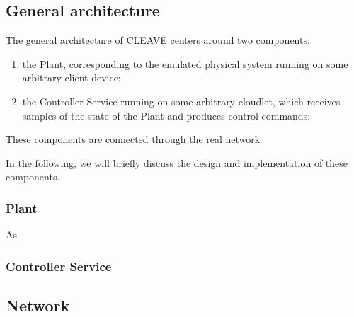 \begin{description}[wide]
\end{description}


\subsection{General architecture}

The general architecture of CLEAVE centers around two components:

\begin{enumerate}
    \item the Plant, corresponding to the emulated physical system running on some arbitrary client device;
    \item the Controller Service running on some arbitrary cloudlet, which receives samples of the state of the Plant and produces control commands;
\end{enumerate}

These components are connected through the real network 

In the following, we will briefly discuss the design and implementation of these components.

\subsubsection{Plant}

As 

\subsubsection{Controller Service}
\subsection{Network}